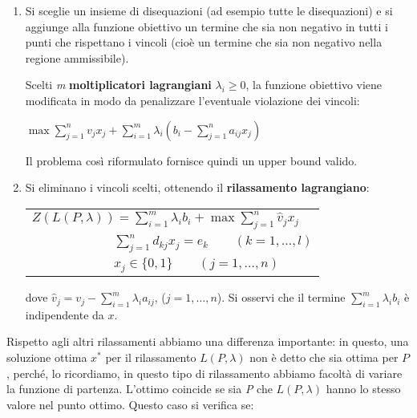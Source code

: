 \documentclass[11pt]{book}
\begin{document}
\begin{enumerate}

\item Si sceglie un insieme di disequazioni (ad esempio tutte le
  disequazioni) e si aggiunge alla funzione obiettivo un termine che
  sia non negativo in tutti i punti che rispettano i vincoli (cio\`e
  un termine che sia non negativo nella regione ammissibile).

  Scelti {\em m} {\bf moltiplicatori lagrangiani} $\lambda_i \geq 0$,
  la funzione obiettivo viene modificata in modo da penalizzare
  l'eventuale violazione dei vincoli:

  \begin{center}
    $\max \sum\limits_{j=1}^n v_jx_j + \sum\limits_{i=1}^m
    \lambda_i(b_i - \sum\limits_{j=1}^n a_{ij}x_j)$
  \end{center}

  Il problema cos\`i riformulato fornisce quindi un upper bound
  valido. 


\item Si eliminano i vincoli scelti, ottenendo il {\bf rilassamento
  lagrangiano}: 

\vspace{11pt}
\begin{center}
\begin{tabular}{l}
$Z(L(P,\lambda)) = \sum\limits_{i=1}^m \lambda_i b_i +  \max \sum \limits_{j=1}^n \hat{v}_j x_j$\\
$\phantom{Z(P) = max} \sum \limits_{j=1}^n d_{kj}x_j = e_k \qquad (k=1,\dots,l)$\\
$\phantom{Z(P) = max} x_j \in \{0,1\} \qquad (j=1,\dots,n)$
\end{tabular}
\end{center}
\vspace{11pt}

dove $\hat{v}_j = v_j - \sum\limits_{i=1}^m \lambda_i a_{ij}$, ($j =
1, \dots, n$). Si osservi che il termine $\sum\limits_{i=1}^m
\lambda_i b_i$ \`e indipendente da $x$.
  
\end{enumerate}

Rispetto agli altri rilassamenti abbiamo una differenza importante: in
questo, una soluzione ottima $x^*$ per il rilassamento $L(P,\lambda)$
non \`e detto che sia ottima per $P$, perch\'e, lo ricordiamo, in
questo tipo di rilassamento abbiamo facolt\`a di variare la funzione
di partenza. L'ottimo coincide se sia {\em P} che $L(P, \lambda)$
hanno lo stesso valore nel punto ottimo. Questo caso si verifica se:
\end{document}
